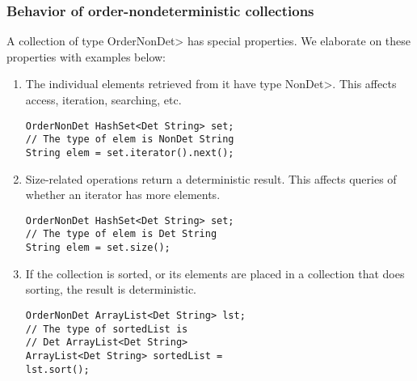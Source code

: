 
\subsubsection{Behavior of order-nondeterministic collections}\label{sec:ond-behavior}
A collection of type \<OrderNonDet> has special properties. We elaborate on these properties
with examples below:

\begin{enumerate}
    \item
    The individual elements retrieved from it have type \<NonDet>.  This
    affects access, iteration, searching, etc.
    \begin{verbatim}
OrderNonDet HashSet<Det String> set; 
// The type of elem is NonDet String
String elem = set.iterator().next();
    \end{verbatim}
    \vspace{-0.4cm}
    \item
    Size-related operations return a deterministic result.  This affects
    queries of whether an iterator has more elements.
    \begin{verbatim}
OrderNonDet HashSet<Det String> set; 
// The type of elem is Det String
String elem = set.size();
    \end{verbatim}
    \vspace{-0.4cm}
    \item
    If the collection is sorted, or its elements are placed in a collection
    that does sorting, the result is deterministic.
    \begin{verbatim}
OrderNonDet ArrayList<Det String> lst; 
// The type of sortedList is 
// Det ArrayList<Det String>
ArrayList<Det String> sortedList = 
lst.sort();
    \end{verbatim}
    \vspace{-0.4cm}
\end{enumerate}

